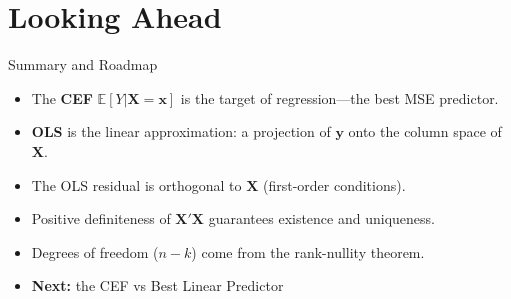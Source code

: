 \documentclass[aspectratio=169, handout, t]{beamer}
\numberwithin{equation}{section}
\begin{document}
\section[Roadmap]{Looking Ahead}


\begin{frame}{Summary and Roadmap}
\begin{itemize}
\item The \textbf{CEF} $\mathbb{E}[Y|\bm{X}=\bm{x}]$ is the target of regression---the best MSE predictor.\pause
\item \textbf{OLS} is the linear approximation: a projection of $\bm{y}$ onto the column space of $\bm{X}$.\pause
\item The OLS residual is orthogonal to $\bm{X}$ (first-order conditions).
\item Positive definiteness of $\bm{X}'\bm{X}$ guarantees existence and uniqueness.\pause
\item Degrees of freedom ($n-k$) come from the rank-nullity theorem.
\bigskip
\item \textbf{Next:} the CEF vs Best Linear Predictor
\end{itemize}
\end{frame}
\end{document}
